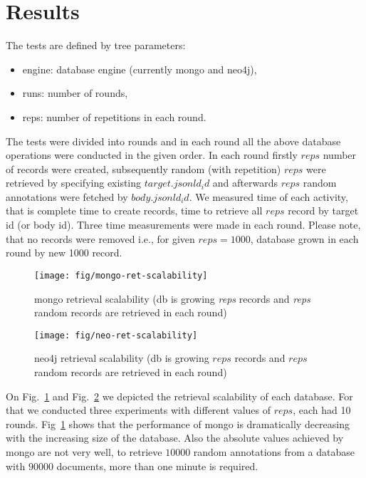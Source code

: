 \documentclass[a4paper,10pt]{article}
\begin{document}
\section{Results}
The tests are defined by tree parameters:
\begin{itemize}
 \item engine: database engine (currently mongo and neo4j),
 \item runs: number of rounds, 
 \item reps: number of repetitions in each round.
\end{itemize}
The tests were divided into rounds and in each round all the above database 
operations were conducted in the given order. In each round firstly $reps$ 
number of records were created, subsequently random (with repetition) $reps$ 
were retrieved by specifying existing $target.jsonld_id$ and afterwards $reps$ 
random annotations were fetched by $body.jsonld_id$. We measured time of each 
activity, that is complete time to create records, time to retrieve all $reps$ 
record by target id (or body id). Three time measurements were made in each 
round. Please note, that no records were removed i.e., for given $reps = 1000$, 
database grown in each round by new 1000 record. 


\begin{figure}
\centering
 \texttt{[image: fig/mongo-ret-scalability]} 
 \caption{mongo retrieval scalability (db is growing \emph{reps} records and \emph{reps} random records are retrieved in each round)} \label{fig:mongo-ret}
\end{figure}


\begin{figure}
\centering
 \texttt{[image: fig/neo-ret-scalability]}
 \caption{neo4j retrieval scalability (db is growing $reps$ records and $reps$ random records are retrieved in each round)} \label{fig:neo-ret}
\end{figure}

On Fig.~\ref{fig:mongo-ret} and Fig.~\ref{fig:neo-ret} we depicted the retrieval 
scalability of each database. For that we conducted three experiments with 
different values of $reps$, each had 10 rounds. Fig~\ref{fig:mongo-ret} shows 
that the performance of mongo is dramatically decreasing with the increasing 
size of the database. Also the absolute values achieved by mongo are not very 
well, to retrieve $10000$ random annotations from a database with $90 000$ 
documents, more than one minute is required. 
\end{document}
